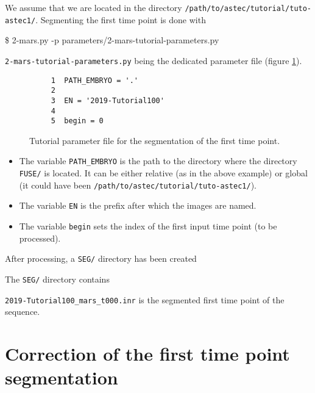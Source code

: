 We assume that we are located in the directory
\texttt{/path/to/astec/tutorial/tuto-astec1/}. Segmenting the first
time point is
done with
\begin{code}{0.8}
  \$ 2-mars.py -p parameters/2-mars-tutorial-parameters.py 
\end{code}
\texttt{2-mars-tutorial-parameters.py} being the
dedicated parameter file  (figure \ref{fig:tutorial:parameter:mars}).

\begin{figure}
\begin{framed}
\begin{verbatim}
     1	PATH_EMBRYO = '.'
     2	
     3	EN = '2019-Tutorial100'
     4	
     5	begin = 0
\end{verbatim}
\end{framed}
\caption{\label{fig:tutorial:parameter:mars} Tutorial
  parameter file for the segmentation of the first time point.}
\end{figure}


\begin{itemize}
  \itemsep -1ex
  \item The variable \texttt{PATH\_EMBRYO} is the path to the directory where
    the directory \texttt{FUSE/} is located. It can be either relative (as in the
    above example) or
    global (it could have been \texttt{/path/to/astec/tutorial/tuto-astec1/}).
  \item The variable \texttt{EN} is the prefix after which the  images
    are named. 
  \item The variable \texttt{begin} sets  the
    index of the first input time point (to be processed).
\end{itemize}

After processing, a \texttt{SEG/} directory has been created

\mbox{}
\mbox{}

The \texttt{SEG/} directory contains

\mbox{}
\mbox{}

\texttt{2019-Tutorial100\_mars\_t000.inr} is the segmented first
  time point of the sequence.



\section{Correction of  the first time point segmentation}
\label{sec:tutorial:manual:correction}


